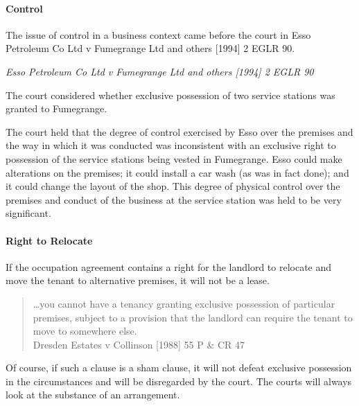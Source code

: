 \documentclass[
]{article}
\newenvironment{env-ab94a4ec-2f9e-4d2f-94d1-74521d1a190e}
{
    \savenotes\tcolorbox[blanker,breakable,left=5pt,borderline west={2pt}{-4pt}{blue}]
}
{
    \endtcolorbox\spewnotes
}
\begin{document}
\hypertarget{control}{%
\paragraph{Control}\label{control}}

The issue of control in a business context came before the court in Esso
Petroleum Co Ltd v Fumegrange Ltd and others {[}1994{]} 2 EGLR 90.

\begin{env-ab94a4ec-2f9e-4d2f-94d1-74521d1a190e}

\emph{Esso Petroleum Co Ltd v Fumegrange Ltd and others {[}1994{]} 2
EGLR 90}

The court considered whether exclusive possession of two service
stations was granted to Fumegrange.

The court held that the degree of control exercised by Esso over the
premises and the way in which it was conducted was inconsistent with an
exclusive right to possession of the service stations being vested in
Fumegrange. Esso could make alterations on the premises; it could
install a car wash (as was in fact done); and it could change the layout
of the shop. This degree of physical control over the premises and
conduct of the business at the service station was held to be very
significant.

\end{env-ab94a4ec-2f9e-4d2f-94d1-74521d1a190e}

\hypertarget{right-to-relocate}{%
\paragraph{Right to Relocate}\label{right-to-relocate}}

If the occupation agreement contains a right for the landlord to
relocate and move the tenant to alternative premises, it will not be a
lease.

\begin{quote}
\ldots you cannot have a tenancy granting exclusive possession of
particular premises, subject to a provision that the landlord can
require the tenant to move to somewhere else.\\
Dresden Estates v Collinson {[}1988{]} 55 P \& CR 47
\end{quote}

Of course, if such a clause is a sham clause, it will not defeat
exclusive possession in the circumstances and will be disregarded by the
court. The courts will always look at the substance of an arrangement.
\end{document}
